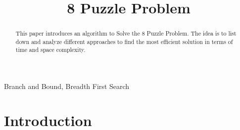 
\IEEEoverridecommandlockouts
\usepackage{cite}
\usepackage{amsmath,amssymb,amsfonts}
\usepackage{algorithm}
\usepackage{algpseudocode}
\usepackage{graphicx}
\usepackage{textcomp}
\usepackage{xcolor}
\usepackage{float}
\def\BibTeX{{\rm B\kern-.05em{\sc i\kern-.025em b}\kern-.08em
    T\kern-.1667em\lower.7ex\hbox{E}\kern-.125emX}}
\algnewcommand{\OR}{\algorithmicor}
\algnewcommand{\AND}{\algorithmicand}
\algnewcommand{\var}{\texttt}


\title{8 Puzzle Problem}
\author{
\and
{}
\and
{}
}
\maketitle

\begin{abstract}
This paper introduces an algorithm to Solve the 8 Puzzle Problem. The idea is to list down and analyze different approaches to find the most efficient solution in terms of time and space complexity.
\end{abstract}

\begin{IEEEkeywords}
Branch and Bound, Breadth First Search

\end{IEEEkeywords}

\section{Introduction}

